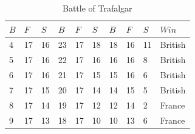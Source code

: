 \documentclass[]{article}
\begin{document}
\begin{table}
 \tiny
\caption{Battle of Trafalgar\\}
\vspace{0.1cm}
\tiny

{\begin{tabular}{|p{.3cm}|p{.3cm}|p{.3cm}|p{.3cm}|p{.3cm}|p{.3cm}|p{.3cm}|p{.3cm}|p{.3cm}|p{.5cm}|} 
\hline
\centering

$B$ & $F$ & $S$	& $B$	& $F$ & $S$	& $B$ & $F$	& $S$ &$Win$ \\
\hline  	

4&	17&	16	&23	&17&	18&	18	&16&	11& British\\
5&	17&	16	&22	&17&	16&	16	&16&	8& British\\
6&	17&	16	&21	&17&	15&	15	&16&	6& British\\
7&	17&	15	&20	&17&	14&	14	&15&	5& British\\
8&	17&	14	&19	&17&	12&	12	&14&	2& France\\
9&	17&	13	&18	&17&	10&	10	&13&	6& France\\

\hline

\end{tabular}}%
\tiny
\end{table}
\end{document}
